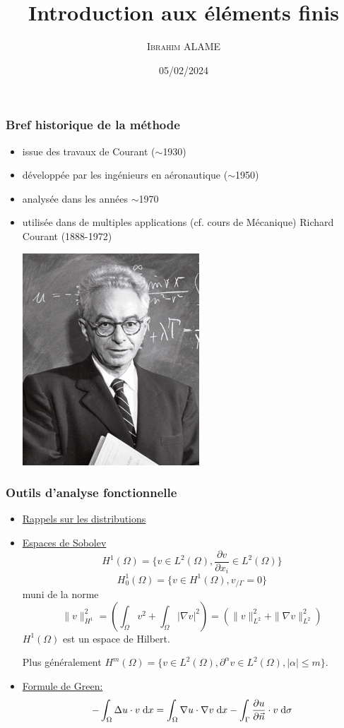 \documentclass{beamer}
\title{Introduction aux éléments finis}
\author{ \textsc{Ibrahim ALAME}}\institute{ESTP}
\date{05/02/2024}
\def \de {{\rm d}}
\begin{document}
 \begin{frame}
  \titlepage
  \end{frame}
  
\begin{frame}
\frametitle{Bref historique de la méthode}

\begin{itemize}
\item issue des travaux de Courant ($\sim$1930)
\item développée par les ingénieurs en aéronautique ($\sim$1950)
\item analysée dans les années $\sim$1970
\item utilisée dans de multiples applications (cf. cours de Mécanique)
Richard Courant (1888-1972)
\begin{center}
\includegraphics[scale=0.3]{courant.jpg} 
\end{center}
\end{itemize}
\end{frame}
\begin{frame}
\frametitle{Outils d'analyse fonctionnelle }
\begin{itemize}
\item \underline{Rappels sur les distributions}
\item \underline{Espaces de Sobolev}
\[\displaystyle H^1(\Omega)=\{v\in L^2(\Omega), \frac{\partial v}{\partial x_i} \in L^2(\Omega)\}\]
\[H_0^1(\Omega)=\{v\in H^1(\Omega), v_{/\Gamma}=0\}\]
muni de la norme
\[\|v\|_{H^1}^2=\left(\int_{\Omega}v^2 + \int_{\Omega} |\nabla v|^2\right)=(\|v\|_{L^2}^2+\|\nabla v\|_{L^2}^2)\]
$H^1(\Omega)$ est un espace de Hilbert.

 Plus généralement $H^m(\Omega)=\{v\in L^2(\Omega), \partial^\alpha v\in L^2(\Omega), |\alpha|\leq m\}$.
\item \underline{Formule de Green:}
\[-\int_\Omega \Delta u\cdot v \; \de x = \int_\Omega \nabla u\cdot \nabla v \; \de x-\int_\Gamma  \frac{\partial u}{\partial \vec n} \cdot v \; \de \sigma\]
\end{itemize}

\end{frame}
\end{document}
